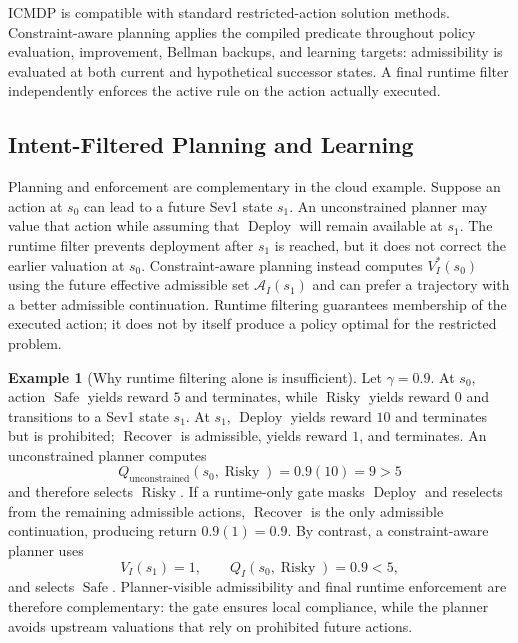 \documentclass[journal]{IEEEtran}
\theoremstyle{definition}
\newtheorem{example}{Example}[section]
\newcommand{\cA}{\mathcal{A}}
\begin{document}
ICMDP is compatible with standard restricted-action solution methods.
Constraint-aware planning applies the compiled predicate throughout policy evaluation,
improvement, Bellman backups, and learning targets: admissibility is evaluated
at both current and hypothetical successor states. A final runtime filter
independently enforces the active rule on the action actually executed.

\subsection{Intent-Filtered Planning and Learning}
\label{subsec:planning}


Planning and enforcement are complementary in the cloud example.
Suppose an action at $s_0$ can lead to a future Sev1 state $s_1$. An
unconstrained planner may value that action while assuming that
$\operatorname{Deploy}$ will remain available at $s_1$. The runtime filter
prevents deployment after $s_1$ is reached, but it does not correct the earlier
valuation at $s_0$. Constraint-aware planning instead computes
$V_I^*(s_0)$ using the future effective admissible set
$\cA_I(s_1)$ and can prefer a trajectory with a better admissible
continuation. Runtime filtering guarantees membership of the executed action;
it does not by itself produce a policy optimal for the restricted problem.

\begin{example}[Why runtime filtering alone is insufficient]
\label{ex:runtime_only}
Let $\gamma=0.9$. At $s_0$, action $\operatorname{Safe}$ yields reward $5$ and
terminates, while $\operatorname{Risky}$ yields reward $0$ and transitions to a
Sev1 state $s_1$. At $s_1$, $\operatorname{Deploy}$ yields reward $10$ and
terminates but is prohibited; $\operatorname{Recover}$ is admissible, yields
reward $1$, and terminates. An unconstrained planner computes
\[
  Q_{\mathrm{unconstrained}}(s_0,\operatorname{Risky})
  =0.9(10)=9>5
\]
and therefore selects $\operatorname{Risky}$. If a runtime-only gate masks
$\operatorname{Deploy}$ and reselects from the remaining admissible actions,
$\operatorname{Recover}$ is the only admissible continuation, producing return
$0.9(1)=0.9$. By contrast,
a constraint-aware planner uses
\[
  V_I(s_1)=1,
  \qquad
  Q_I(s_0,\operatorname{Risky})=0.9<5,
\]
and selects $\operatorname{Safe}$. Planner-visible admissibility and final
runtime enforcement are therefore complementary: the gate ensures local
compliance, while the planner avoids upstream valuations that rely on
prohibited future actions.
\end{example}
\end{document}
